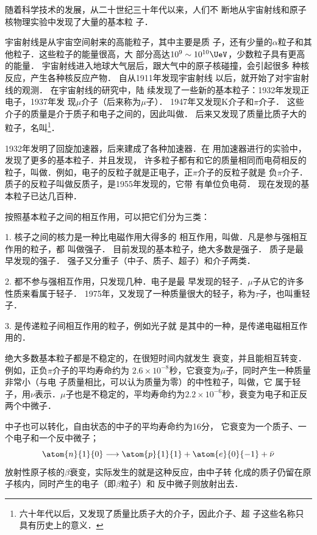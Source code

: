 随着科学技术的发展，从二十世纪三十年代以来，人们不
断地从宇宙射线和原子核物理实验中发现了大量的基本粒
子．

宇宙射线是从宇宙空间射来的高能粒子，其中主要是质
子，还有少量的$\alpha$粒子和其他粒子．这些粒子的能量很高，大
部分高达$10^9 \sim 10^{10} \UeV$，少数粒子具有更高的能量．
宇宙射线进入地球大气层后，跟大气中的原子核碰撞，会引起很多
种核反应，产生各种核反应产物．
自从1911年发现宇宙射线
以后，就开始了对宇宙射线的观测．
在宇宙射线的研究中，陆
续发现了一些新的基本粒子：1932年发现正电子，1937年发
现$\mu$介子（后来称为$\mu$子）．
1947年又发现K介子和$\pi$介子．
这些介子的质量是介于质子和电子之间的，因此叫做．
后来又发现了质量比质子大的粒子，名叫\footnote{六十年代以后，又发现了质量比质子大的介子，因此介子、超
子这些名称只具有历史上的意义．}．

1932年发明了回旋加速器，后来建成了各种加速器．在
用加速器进行的实验中，发现了更多的基本粒子．并且发现，
许多粒子都有和它的质量相同而电荷相反的粒子，叫做．例如，电子的反粒子就是正电子，正$\pi$介子的反粒子就是
负$\pi$介子．
质子的反粒子叫做反质子，是1955年发现的，它带
有单位负电荷．
现在发现的基本粒子已达几百种．

按照基本粒子之间的相互作用，可以把它们分为三类：

1.  核子之间的核力是一种比电磁作用大得多的
相互作用，叫做．凡是参与强相互作用的粒子，都
叫做强子．
目前发现的基本粒子，绝大多数是强子．
质子是最
早发现的强子．
强子又分重子（中子、质子、超子）和介子两类．

2.  都不参与强相互作用，只发现几种．电子是最
早发现的轻子．$\mu$子从它的许多性质来看属于轻子．
1975年，又发现了一种质量很大的轻子，称为$\tau$子，也叫重轻子．

3.  是传递粒子间相互作用的粒子，例如光子就
是其中的一种，是传递电磁相互作用的．

绝大多数基本粒子都是不稳定的，在很短时间内就发生
衰变，并且能相互转变．
例如，正负$\pi$介子的平均寿命约为
$2.6\times10^{-8}$秒，它衰变为$\mu$子，同时产生一种质量非常小（与电
子质量相比，可以认为质量为零）的中性粒子，叫做，它
属于轻子，用$\nu$表示．$\mu$子也是不稳定的，平均寿命约为$2.2\times
10^{-6}$秒，衰变为电子和正反两个中微子．

中子也可以转化，自由状态的中子的平均寿命约为16分，
它衰变为一个质子、一个电子和一个反中微子；
\[\atom{n}{1}{0}\longrightarrow \atom{p}{1}{1}+\atom{e}{0}{-1}+ \bar{\nu}   \]
放射性原子核的$\beta$衰变，实际发生的就是这种反应，由中子转
化成的质子仍留在原子核内，同时产生的电子（即$\beta$粒子）和
反中微子则放射出去．

